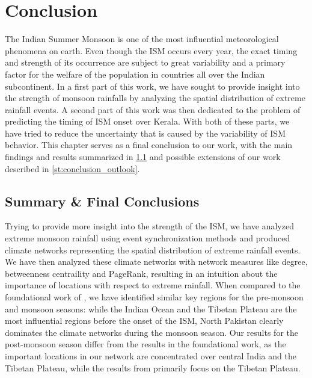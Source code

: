 \chapter{Conclusion}
\label{c:conclusion}
The Indian Summer Monsoon is one of the most influential meteorological phenomena on earth. Even though the ISM occurs every year, the exact timing and strength of its occurrence are subject to great variability and a primary factor for the welfare of the population in countries all over the Indian subcontinent. In a first part of this work, we have sought to provide insight into the strength of monsoon rainfalls by analyzing the spatial distribution of extreme rainfall events. A second part of this work was then dedicated to the problem of predicting the timing of ISM onset over Kerala. With both of these parts, we have tried to reduce the uncertainty that is caused by the variability of ISM behavior. This chapter serves as a final conclusion to our work, with the main findings and results summarized in \cref{st:conclusion_summary} and possible extensions of our work described in \cref{st:conclusion_outlook}.

\section{Summary \& Final Conclusions}
\label{st:conclusion_summary}
Trying to provide more insight into the strength of the ISM, we have analyzed extreme monsoon rainfall using event synchronization methods and produced climate networks representing the spatial distribution of extreme rainfall events. We have then analyzed these climate networks with network measures like degree, betweenness centraility and PageRank, resulting in an intuition about the importance of locations with respect to extreme rainfall. When compared to the foundational work of \citet{Stolbova.2015}, we have identified similar key regions for the pre-monsoon and monsoon seasons: while the Indian Ocean and the Tibetan Plateau are the most influential regions before the onset of the ISM, North Pakistan clearly dominates the climate networks during the monsoon season. Our results for the post-monsoon season differ from the results in the foundational work, as the important locations in our network are concentrated over central India and the Tibetan Plateau, while the results from \citet{Stolbova.2015} primarily focus on the Tibetan Plateau.

